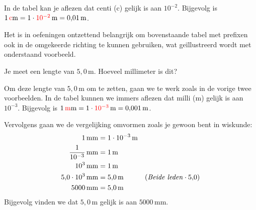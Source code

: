\documentclass{ximera}
\begin{document}
\begin{example}[title={Rekenen met prefixen}]\nl
    In de tabel kan je aflezen dat centi (c) gelijk is aan $10^{-2}$. Bijgevolg is $1 \, \textcolor{red}{\mathrm{c}}\mathrm{m} = 1 \cdot \textcolor{red}{10^{-2}} \, \mathrm{m} = 0{,}01 \, \mathrm{m}$.
\end{example}

Het is in oefeningen ontzettend belangrijk om bovenstaande tabel met prefixen ook in de omgekeerde richting te kunnen gebruiken, wat geïllustreerd wordt met onderstaand voorbeeld.

\begin{example}[foldable=true,title={Voorbeeld: van meter naar millimeter}]\nl
    Je meet een lengte van $5{,}0 \, \mathrm{m}$. Hoeveel millimeter is dit?

    \begin{solution}\nl
    Om deze lengte van $5{,}0 \, \mathrm{m}$ om te zetten, gaan we te werk zoals in de vorige twee voorbeelden. In de tabel kunnen we immers aflezen dat milli (m) gelijk is aan $10^{-3}$. Bijgevolg is $1 \, \textcolor{red}{\mathrm{m}}\mathrm{m} = 1 \cdot \textcolor{red}{10^{-3}} \, \mathrm{m} = 0{,}001 \, \mathrm{m}$.

    Vervolgens gaan we de vergelijking omvormen zoals je gewoon bent in wiskunde:
    \begin{align*}
    1 \, \mathrm{mm} &= 1 \cdot 10^{-3} \, \mathrm{m} & \\
    \frac{1}{10^{-3}} \, \mathrm{mm} &= 1 \, \mathrm{m} & \\
    10^{3} \, \mathrm{mm} &= 1 \, \mathrm{m} & \\
    5{,}0 \cdot 10^{3} \, \mathrm{mm} &= 5{,}0 \, \mathrm{m} & (\text{\textit{Beide leden}} \cdot 5{,}0) \\
    5000 \, \mathrm{mm} &= 5{,}0 \, \mathrm{m} &
    \end{align*}
    Bijgevolg vinden we dat $5{,}0 \, \mathrm{m}$ gelijk is aan $5000 \, \mathrm{mm}$.
    \end{solution}
\end{example}
\end{document}
